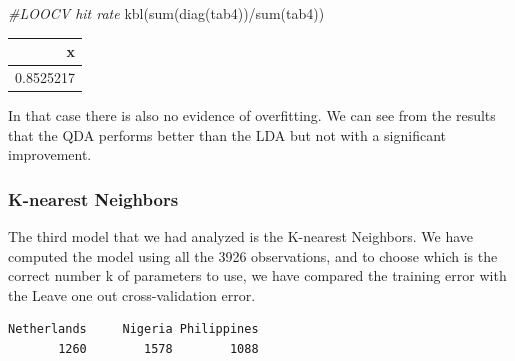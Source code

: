 \documentclass[
  11pt,
]{article}
\newenvironment{Shaded}{\begin{snugshade}}{\end{snugshade}}
\newcommand{\CommentTok}[1]{\textcolor[rgb]{0.56,0.35,0.01}{\textit{#1}}}
\newcommand{\FunctionTok}[1]{\textcolor[rgb]{0.00,0.00,0.00}{#1}}
\newcommand{\NormalTok}[1]{#1}
\newcommand{\SpecialCharTok}[1]{\textcolor[rgb]{0.00,0.00,0.00}{#1}}
\begin{document}
\begin{Shaded}
\begin{Highlighting}[]
\CommentTok{\#LOOCV hit rate}
\FunctionTok{kbl}\NormalTok{(}\FunctionTok{sum}\NormalTok{(}\FunctionTok{diag}\NormalTok{(tab4))}\SpecialCharTok{/}\FunctionTok{sum}\NormalTok{(tab4))}
\end{Highlighting}
\end{Shaded}

\begin{tabular}[t]{r}
\hline
x\\
\hline
0.8525217\\
\hline
\end{tabular}

In that case there is also no evidence of overfitting. We can see from the results that the QDA performs better than the LDA but not with a significant improvement.

\hypertarget{k-nearest-neighbors}{%
\subsubsection{K-nearest Neighbors}\label{k-nearest-neighbors}}

The third model that we had analyzed is the K-nearest Neighbors. We have computed the model using all the 3926 observations, and to choose which is the correct number k of parameters to use, we have compared the training error with the Leave one out cross-validation error.

\begin{Shaded}
\end{Shaded}

\begin{verbatim}
Netherlands     Nigeria Philippines 
       1260        1578        1088 
\end{verbatim}
\end{document}
